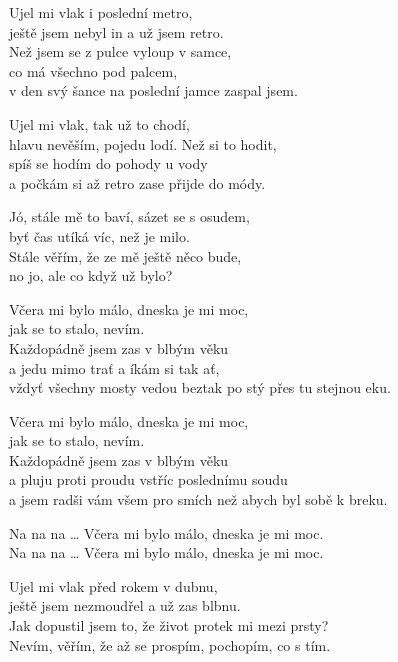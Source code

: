 
\ve
Ujel mi vlak i poslední metro,\\
ještě jsem nebyl in a už jsem retro.\\
Než jsem se z pulce vyloup v samce,\\
co má všechno pod palcem,\\
v den svý šance na poslední jamce zaspal jsem.

\ve{}
Ujel mi vlak, tak už to chodí,\\
hlavu nevěším, pojedu lodí. Než si to hodit,\\
spíš se hodím do pohody u vody\\
a počkám si až retro zase přijde do módy.

\re{*:}
Jó, stále mě to baví, sázet se s osudem,\\
byť čas utíká víc, než je milo.\\
Stále věřím, že ze mě ještě něco bude,\\
no jo, ale co když už bylo?

\cho{}
Včera mi bylo málo, dneska je mi moc,\\
jak se to stalo, nevím.\\
Každopádně jsem zas v blbým věku\\
a jedu mimo trať a íkám si tak ať,\\
vždyť všechny mosty vedou beztak po stý přes tu stejnou eku.

Včera mi bylo málo, dneska je mi moc,\\
jak se to stalo, nevím.\\
Každopádně jsem zas v blbým věku\\
a pluju proti proudu vstříc poslednímu soudu\\
a jsem radši vám všem pro smích než abych byl sobě k breku.

Na na na \ldots{} Včera mi bylo málo, dneska je mi moc.\\
Na na na \ldots{} Včera mi bylo málo, dneska je mi moc.

\ve{}
Ujel mi vlak před rokem v dubnu,\\
ještě jsem nezmoudřel a už zas blbnu.\\
Jak dopustil jsem to, že život protek mi mezi prsty?\\
Nevím, věřím, že až se prospím, pochopím, co s tím.

